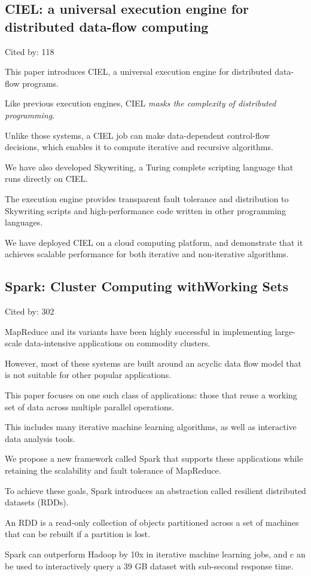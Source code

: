 \documentclass[a4paper,11pt]{article}
\begin{document}
\subsection*{CIEL: a universal execution engine for distributed data-flow computing}
{\color{cyan} {\color{magenta} Cited by: 118}

This paper introduces 
{\color{black} CIEL\cite{ciel}}, 
a universal execution engine
for distributed data-flow programs. 

Like previous execution engines, 
CIEL 
{\color{red} \em masks the complexity of distributed programming}. 

Unlike those systems, a 
CIEL job can make data-dependent control-flow decisions, which 
enables it to compute iterative and recursive algorithms.

We have also developed Skywriting, a 
Turing complete scripting language that runs directly on CIEL.

The execution engine provides 
transparent fault tolerance and 
distribution to Skywriting scripts and 
high-performance code written in other programming languages.

We have 
deployed CIEL on a cloud computing platform, and 
demonstrate that it achieves scalable performance 
for both iterative and non-iterative algorithms.	

}

\subsection*{Spark: Cluster Computing withWorking Sets}
{\color{cyan} {\color{magenta} Cited by: 302}

MapReduce and its variants 
have been highly successful 
in implementing large-scale data-intensive applications on commodity clusters. 

However, 
most of these systems are built around an acyclic data flow model 
that is not suitable for other popular applications. 

This paper 
focuses on one such class of applications: 
those that reuse a working set of data across multiple parallel operations.

This includes many 
iterative machine learning algorithms, as well as 
interactive data analysis tools. 

We propose 
a new framework called 
{\color{black} Spark\cite{spark}} 
that supports these applications
while retaining the scalability and fault tolerance of MapReduce. 

To achieve these goals, 
Spark introduces an abstraction called resilient distributed datasets (RDDs).

An RDD is a 
read-only collection of objects 
partitioned across a set of machines 
that can be rebuilt if a partition is lost. 

Spark 
can outperform Hadoop by 10x in iterative machine learning jobs, and c
an be used to interactively query a 39 GB dataset with sub-second response time.

}
\end{document}
